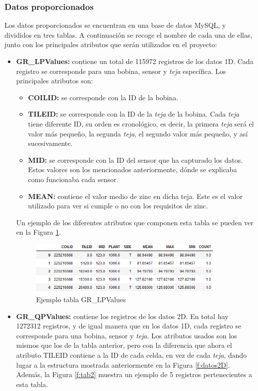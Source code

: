 \subsubsection{Datos proporcionados}
Los datos proporcionados se encuentran en una base de datos MySQL, y divididos en tres tablas. A continuación se recoge el nombre de cada una de ellas, junto con los principales atributos que serán utilizados en el proyecto:
\begin{itemize}
    \item \textbf{GR\_LPValues:} contiene un total de 115972 registros de los datos 1D. Cada registro se corresponde para una bobina, sensor y \emph{teja} específica. Los principales atributos son:
    \begin{itemize}
        \item \textbf{COILID:} se corresponde con la ID de la bobina.
        \item \textbf{TILEID:} se corresponde con la ID de la \emph{teja} de la bobina. Cada \emph{teja} tiene diferente ID, su orden es cronológico, es decir, la primera \emph{teja} será el valor más pequeño, la segunda \emph{teja}, el segundo valor más pequeño, y así sucesivamente.
        \item \textbf{MID:} se corresponde con la ID del sensor que ha capturado los datos. Estos valores son los mencionados anteriormente, dónde se explicaba como funcionaba cada sensor.
        \item \textbf{MEAN:} contiene el valor medio de zinc en dicha teja. Este es el valor utilizado para ver si cumple o no con los requisitos de zinc.  
        \end{itemize}
    Un ejemplo de los diferentes atributos que componen esta tabla se pueden ver en la Figura \ref{f:tab1}.
    \begin{figure}[h]
     \centering
      \includegraphics[width=0.9\textwidth]{img/eje1D.PNG}
     \caption{Ejemplo tabla GR\_LPValues}
     \label{f:tab1}
    \end{figure}
    \item  \textbf{GR\_QPValues:} contiene los registros de los datos 2D. En total hay 1272312 registros, y de igual manera que en los datos 1D, cada registro se corresponde para una bobina, sensor y \emph{teja}. Los atributos usados son los mismos que los de la tabla anterior, pero con la diferencia que ahora el atributo TILEID contiene a la ID de cada celda, en vez de cada \emph{teja}, dando lugar a la estructura mostrada anteriormente en la Figura \ref{f:datos2D}. Además, la Figura \ref{f:tab2} muestra un ejemplo de 5 registros pertenecientes a esta tabla.

\end{itemize}
